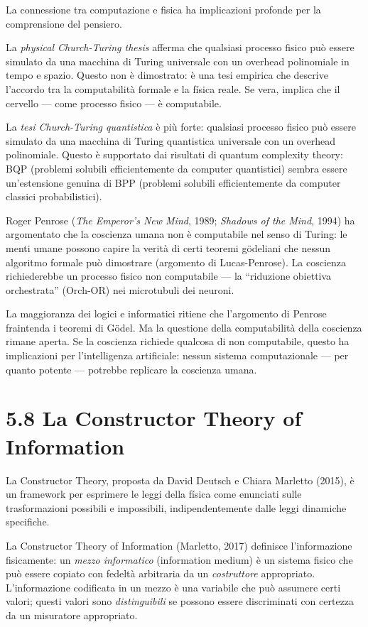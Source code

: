 \documentclass[11.5pt,a4paper,openany]{book}
\theoremstyle{remark}
\begin{document}
La connessione tra computazione e fisica ha implicazioni profonde per la comprensione del pensiero.

La \textit{physical Church-Turing thesis} afferma che qualsiasi processo fisico può essere simulato da una macchina di Turing universale con un overhead polinomiale in tempo e spazio. Questo non è dimostrato: è una tesi empirica che descrive l'accordo tra la computabilità formale e la física reale. Se vera, implica che il cervello --- come processo fisico --- è computabile.

La \textit{tesi Church-Turing quantistica} è più forte: qualsiasi processo fisico può essere simulato da una macchina di Turing quantistica universale con un overhead polinomiale. Questo è supportato dai risultati di quantum complexity theory: BQP (problemi solubili efficientemente da computer quantistici) sembra essere un'estensione genuina di BPP (problemi solubili efficientemente da computer classici probabilistici).

Roger Penrose (\textit{The Emperor's New Mind}, 1989; \textit{Shadows of the Mind}, 1994) ha argomentato che la coscienza umana non è computabile nel senso di Turing: le menti umane possono capire la verità di certi teoremi gödeliani che nessun algoritmo formale può dimostrare (argomento di Lucas-Penrose). La coscienza richiederebbe un processo fisico non computabile --- la ``riduzione obiettiva orchestrata'' (Orch-OR) nei microtubuli dei neuroni.

La maggioranza dei logici e informatici ritiene che l'argomento di Penrose fraintenda i teoremi di Gödel. Ma la questione della computabilità della coscienza rimane aperta. Se la coscienza richiede qualcosa di non computabile, questo ha implicazioni per l'intelligenza artificiale: nessun sistema computazionale --- per quanto potente --- potrebbe replicare la coscienza umana.

\section{5.8 La Constructor Theory of Information}

La Constructor Theory, proposta da David Deutsch e Chiara Marletto (2015), è un framework per esprimere le leggi della física come enunciati sulle trasformazioni possibili e impossibili, indipendentemente dalle leggi dinamiche specifiche.

La Constructor Theory of Information (Marletto, 2017) definisce l'informazione fisicamente: un \textit{mezzo informatico} (information medium) è un sistema fisico che può essere copiato con fedeltà arbitraria da un \textit{costruttore} appropriato. L'informazione codificata in un mezzo è una variabile che può assumere certi valori; questi valori sono \textit{distinguibili} se possono essere discriminati con certezza da un misuratore appropriato.
\end{document}

